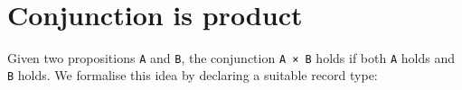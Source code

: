 \begin{fence}
\begin{code}%
\>[0]\AgdaSpace{}%
\AgdaSpace{}%
\AgdaSpace{}%
\<%
\\
\>[0]\AgdaSpace{}%
\AgdaSpace{}%
\AgdaSpace{}%
\AgdaSymbol{(}\AgdaSymbol{;}\AgdaSpace{}%
\AgdaSymbol{)}\<%
\\
\>[0]\AgdaSpace{}%
\<%
\\
\>[0]\AgdaSpace{}%
\AgdaSpace{}%
\AgdaSpace{}%
\AgdaSpace{}%
\AgdaSymbol{(}\AgdaSymbol{)}\<%
\\
\>[0]\AgdaSpace{}%
\AgdaSpace{}%
\AgdaSpace{}%
\AgdaSpace{}%
\AgdaSymbol{(}\AgdaSymbol{)}\<%
\\
\>[0]\AgdaSpace{}%
\AgdaSpace{}%
\AgdaSpace{}%
\AgdaSpace{}%
\AgdaSymbol{(}\AgdaSymbol{;}\AgdaSpace{}%
\AgdaSymbol{;}\AgdaSpace{}%
\AgdaSymbol{)}\<%
\\
\>[0]\AgdaSpace{}%
\<%
\end{code}
\end{fence}

\hypertarget{conjunction-is-product}{%
\section{Conjunction is product}\label{conjunction-is-product}}

Given two propositions \texttt{A} and \texttt{B}, the conjunction
\texttt{A\ ×\ B} holds if both \texttt{A} holds and \texttt{B} holds. We
formalise this idea by declaring a suitable record type:

